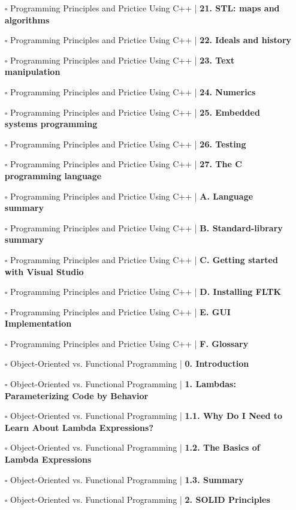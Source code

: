 \documentclass[a4, landscape, 12pt]{article}
\newcommand{\checkbox}{$\square$}%
\begin{document}
\begin{itemize}
{}
\item [\checkbox]  Programming Principles and Prictice Using C++  | \textbf{ 21. STL: maps and algorithms
}
\item [\checkbox]  Programming Principles and Prictice Using C++  | \textbf{ 22. Ideals and history
}
\item [\checkbox]  Programming Principles and Prictice Using C++  | \textbf{ 23. Text manipulation
}
\item [\checkbox]  Programming Principles and Prictice Using C++  | \textbf{ 24. Numerics
}
\item [\checkbox]  Programming Principles and Prictice Using C++  | \textbf{ 25. Embedded systems programming
}
\item [\checkbox]  Programming Principles and Prictice Using C++  | \textbf{ 26. Testing
}
\item [\checkbox]  Programming Principles and Prictice Using C++  | \textbf{ 27. The C programming language
}
\item [\checkbox]  Programming Principles and Prictice Using C++  | \textbf{ A. Language summary
}
\item [\checkbox]  Programming Principles and Prictice Using C++  | \textbf{ B. Standard-library summary
}
\item [\checkbox]  Programming Principles and Prictice Using C++  | \textbf{ C. Getting started with Visual Studio
}
\item [\checkbox]  Programming Principles and Prictice Using C++  | \textbf{ D. Installing FLTK
}
\item [\checkbox]  Programming Principles and Prictice Using C++  | \textbf{ E. GUI Implementation
}
\item [\checkbox]  Programming Principles and Prictice Using C++  | \textbf{ F. Glossary
}
\item [\checkbox]  Object-Oriented vs. Functional Programming | \textbf{ 0. Introduction
}
\item [\checkbox]  Object-Oriented vs. Functional Programming | \textbf{ 1. Lambdas: Parameterizing Code by Behavior
}
\item [\checkbox]  Object-Oriented vs. Functional Programming | \textbf{ 1.1. Why Do I Need to Learn About Lambda Expressions?
}
\item [\checkbox]  Object-Oriented vs. Functional Programming | \textbf{ 1.2. The Basics of Lambda Expressions
}
\item [\checkbox]  Object-Oriented vs. Functional Programming | \textbf{ 1.3. Summary
}
\item [\checkbox]  Object-Oriented vs. Functional Programming | \textbf{ 2. SOLID Principles
}
\end{itemize}
\end{document}
